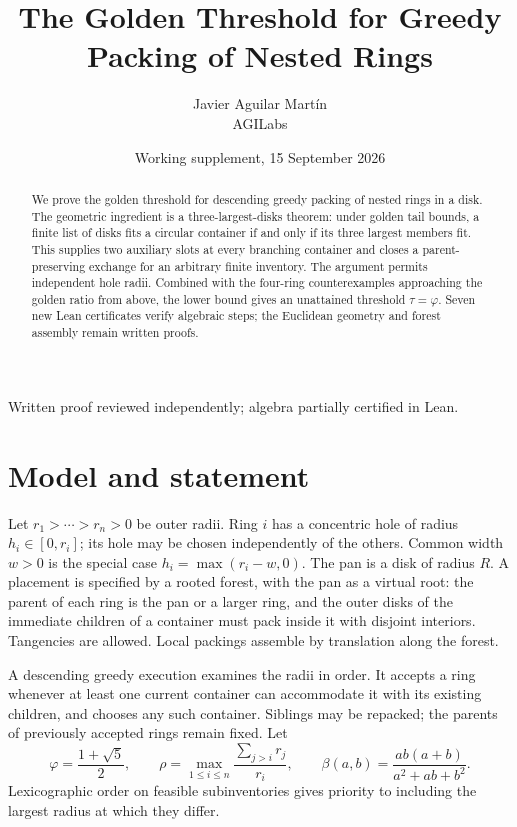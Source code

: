 \documentclass[11pt]{article}
\title{The Golden Threshold for Greedy Packing of Nested Rings}
\author{Javier Aguilar Mart\'in\\AGILabs}
\date{Working supplement, 15 September 2026}
\theoremstyle{remark}
\newcommand{\ph}{\varphi}
\newcommand{\bp}{\beta}
\begin{document}
\maketitle
\begin{center}
\small Written proof reviewed independently; algebra partially certified in Lean.
\end{center}
\begin{abstract}
We prove the golden threshold for descending
greedy packing of nested rings in a disk. The geometric ingredient is a
three-largest-disks theorem: under golden tail bounds, a finite list of
disks fits a circular container if and only if its three largest members
fit. This supplies two auxiliary slots at every branching container and
closes a parent-preserving exchange for an arbitrary finite inventory.
The argument permits independent hole radii. Combined with the four-ring
counterexamples approaching the golden ratio from above, the
lower bound gives an unattained threshold $\tau=\ph$.
Seven new Lean certificates verify algebraic steps; the Euclidean geometry
and forest assembly remain written proofs.
\end{abstract}

\section{Model and statement}

Let $r_1>\cdots>r_n>0$ be outer radii. Ring $i$ has a concentric hole
of radius $h_i\in[0,r_i]$; its hole may be chosen independently of the
others. Common width $w>0$ is the special case
$h_i=\max(r_i-w,0)$. The pan is a disk of radius $R$.
A placement is specified by a rooted forest, with the pan as a virtual
root: the parent of each ring is the pan or a larger ring, and the outer
disks of the immediate children of a container must pack inside it with
disjoint interiors. Tangencies are allowed. Local packings assemble by
translation along the forest.

A descending greedy execution examines the radii in order. It accepts
a ring whenever at least one current container can accommodate it with
its existing children, and chooses any such container. Siblings may be
repacked; the parents of previously accepted rings remain fixed. Let
\[
 \ph=\frac{1+\sqrt5}{2},\qquad
 \rho=\max_{1\le i\le n}\frac{\sum_{j>i}r_j}{r_i},\qquad
 \bp(a,b)=\frac{ab(a+b)}{a^2+ab+b^2}.
\]
Lexicographic order on feasible subinventories gives priority to including
the largest radius at which they differ.
\end{document}
